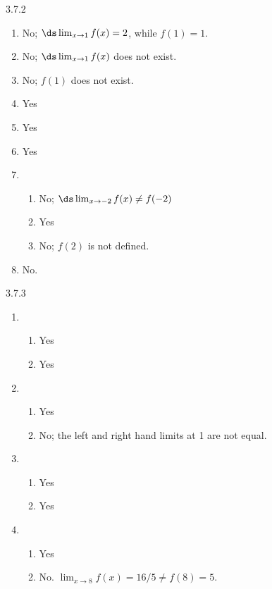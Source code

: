 \begin{Answer}{3.7.2}
\begin{enumerate}
\item {No; $\ds \lim_{x\to 1} f(x) = 2$, while $f(1) = 1$.}
\item {No; $\ds \lim_{x\to 1} f(x)$ does not exist.}
\item {No; $f(1)$ does not exist.}
\item {Yes}
\item {Yes}
\item {Yes}
\item {\begin{enumerate}
\item		No; $\ds \lim_{x\to -2}f(x) \neq f(-2)$
\item		Yes
\item		No; $f(2)$ is not defined.
\end{enumerate}
}
\item No.
\end{enumerate}
\end{Answer}
\begin{Answer}{3.7.3}
\begin{enumerate}
\item {\begin{enumerate}
\item		Yes
\item		Yes
\end{enumerate}
}
\item {\begin{enumerate}
\item		Yes
\item		No; the left and right hand limits at 1 are not equal.
\end{enumerate}
}
\item {\begin{enumerate}
\item		Yes
\item		Yes
\end{enumerate}
}
\item {\begin{enumerate}
\item		Yes
\item		No. $\lim_{x\to 8} f(x) = 16/5 \neq f(8) = 5$.
\end{enumerate}
}
\end{enumerate}
\end{Answer}
